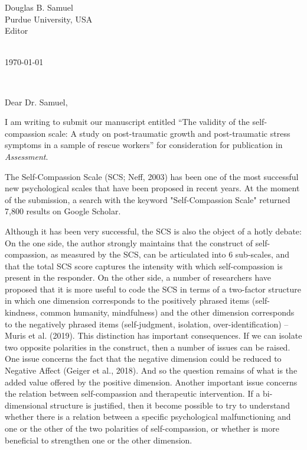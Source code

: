 \documentclass[a4paper]{letter} %
\def\opening#1{\thispagestyle{empty}
{\centering\fromaddress \vspace{0.6in} \\ %
\hspace*{\longindentation}\today\hspace*{\fill}\par} %
{\raggedright \toname \\ \toaddress \par} %
\vspace{0.4in} %
\noindent #1 %
}
\begin{document}

\begin{letter}
{Douglas B. Samuel\\
Purdue University, USA \\
Editor\\
}



\opening{Dear Dr. Samuel,}

I am writing to submit our manuscript entitled ``The validity of the self-compassion scale: A study on post-traumatic growth and post-traumatic stress symptoms in a sample of rescue workers'' for consideration for publication in \emph{Assessment}. 

The Self-Compassion Scale (SCS; Neff, 2003) has been one of the most successful new psychological scales that have been proposed in recent years. At the moment of the submission, a search with the keyword "Self-Compassion Scale" returned 7,800 results on Google Scholar. 

Although it has been very successful, the SCS is also the object of a hotly debate: On the one side, the author strongly maintains that the construct of self-compassion, as measured by the SCS, can be articulated into 6 sub-scales, and that the total SCS score captures the intensity with which self-compassion is present in the responder. On the other side, a number of researchers have proposed that it is more useful to code the SCS in terms of a two-factor structure in which one dimension corresponds to the positively phrased items (self-kindness, common humanity, mindfulness) and the other dimension corresponds to the negatively phrased items (self-judgment, isolation, over-identification) -- Muris et al. (2019). This distinction has important consequences.  If we can isolate two opposite polarities in the construct, then a number of issues can be raised.  One issue concerns the fact that the negative dimension could be reduced to Negative Affect (Geiger et al., 2018). And so the question remains of what is the added value offered by the positive dimension. Another important issue concerns the relation between self-compassion and therapeutic intervention. If a bi-dimensional structure is justified, then it become possible to try to understand whether there is a relation between a specific psychological malfunctioning and one or the other of the two polarities of self-compassion, or whether is more beneficial to strengthen one or the other dimension.


\end{letter}
\end{document}
